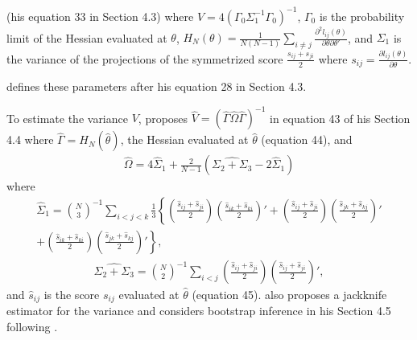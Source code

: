 \documentclass[12pt]{article}
\theoremstyle{definition}
\begin{document}
(his equation 33 in Section 4.3) where $V = 4\left(\Gamma_0 \Sigma_1^{-1}\Gamma_0\right)^{-1}$, $\Gamma_0$ is the probability limit of the Hessian evaluated at $\theta$, $H_{N}(\theta) = \frac{1}{N(N-1)}\sum_{i \neq j}\frac{\partial^2l_{ij}(\theta)}{\partial\theta \partial\theta'}$, and $\Sigma_1$ is the variance of the projections of the symmetrized score $\frac{s_{ij} + s_{ji}}{2}$ where $s_{ij} = \frac{\partial l_{ij}(\theta)}{\partial\theta}$. {\cite{graham2020network} defines these parameters after his equation 28 in Section 4.3.   

To estimate the variance $V$, \cite{graham2020network} proposes $\hat{V} = \left(\hat{\Gamma}\hat{\Omega}\hat{\Gamma}\right)^{-1}$ in equation 43 of his Section 4.4 where $\hat{\Gamma} = H_{N}(\hat{\theta})$, the Hessian evaluated at $\hat{\theta}$ (equation 44), and 
\begin{align*}
\hat{\Omega} = 4\hat{\Sigma}_1 + \frac{2}{N-1}\left(\widehat{\Sigma_2 + \Sigma_3} - 2\hat{\Sigma}_1\right)
\end{align*}
where 
\begin{align*}
\hat{\Sigma}_1 = {N \choose 3}^{-1}\sum_{i < j < k}\frac{1}{3}\left\{\left(\frac{\hat{s}_{ij}+\hat{s}_{ji}}{2}\right)\left(\frac{\hat{s}_{ik}+\hat{s}_{ki}}{2}\right)' + \left(\frac{\hat{s}_{ij}+\hat{s}_{ji}}{2}\right)\left(\frac{\hat{s}_{jk}+\hat{s}_{kj}}{2}\right)' \right. \\ \left.+ \left(\frac{\hat{s}_{ik}+\hat{s}_{ki}}{2}\right)\left(\frac{\hat{s}_{jk}+\hat{s}_{kj}}{2}\right)' \right\},
\end{align*}
\begin{align*}
\widehat{\Sigma_2 + \Sigma_3} = {N \choose 2}^{-1}\sum_{i < j}\left(\frac{\hat{s}_{ij}+\hat{s}_{ji}}{2}\right)\left(\frac{\hat{s}_{ij}+\hat{s}_{ji}}{2}\right)',
\end{align*}
 and $\hat{s}_{ij}$ is the score $s_{ij}$ evaluated at $\hat{\theta}$ (equation 45). \cite{graham2020network} also proposes a jackknife estimator for the variance and considers bootstrap inference in his Section 4.5 following \cite{menzel2017bootstrap}.  
%
%
}
\end{document}
